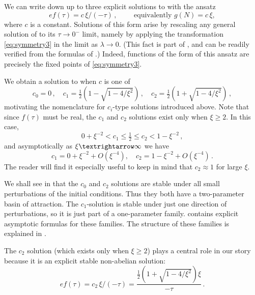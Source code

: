 We can write down up to three explicit solutions to  with the ansatz 
\begin{equation}
ef(\tau)=c\,\xi/(-\tau)\,,\qquad\textrm{ equivalently }g(N)=c\,\xi,\label{eq:ansatz-f}
\end{equation}
where $c$ is a constant. Solutions of this form arise by rescaling any general solution of  to its $\tau\to0^{-}$ limit, namely by applying the transformation \eqref{eq:symmetry3} in the limit as $\lambda\to0$. (This fact is part of , and can be readily verified from the formulas of .) Indeed, functions of the form of this ansatz are precisely the fixed points of \eqref{eq:symmetry3}.

We obtain a solution to  when $c$ is one of 
\begin{equation}
c_{0}=0\,,\quad c_{1}=\tfrac{1}{2}(1-\sqrt{1-4/\xi^{2}})\,,\quad c_{2}=\tfrac{1}{2}(1+\sqrt{1-4/\xi^{2}})\,,\label{eq:c-definitions}
\end{equation}
motivating the nomenclature for $c_{i}$\nobreakdash-type solutions introduced above. Note that since $f(\tau)$ must be real, the $c_{1}$ and $c_{2}$ solutions exist only when $\xi\geq2$. In this case, 
\[
0+\xi^{-2}<c_{1}\leq\tfrac{1}{2}\leq c_{2}<1-\xi^{-2}\,,
\]
and asymptotically as $\xi\textrightarrow\infty$ we have 
\begin{equation}
c_{1}=0+\xi^{-2}+O(\xi^{-4}),\quad c_{2}=1-\xi^{-2}+O(\xi^{-4})\,.\label{eq:c-asymptotics}
\end{equation}
The reader will find it especially useful to keep in mind that $c_{2}\approx1$ for large $\xi$.

We shall see in  that the $c_{0}$ and $c_{2}$ solutions are stable under all small perturbations of the initial conditions. Thus they both have a two-parameter basin of attraction. The $c_{1}$-solution is stable under just one direction of perturbations, so it is just part of a one-parameter family.  contains explicit asymptotic formulas for these families. The structure of these families is explained in .

The $c_{2}$ solution (which exists only when $\xi\geq2$) plays a central role in our story because it is an explicit stable non-abelian solution: 
\begin{equation}
ef(\tau)=c_{2}\,\xi/(-\tau)=\frac{\tfrac{1}{2}\left(1+\sqrt{1-4/\xi^{2}}\right)\xi}{-\tau}\,.\label{eq:c2solution}
\end{equation}

